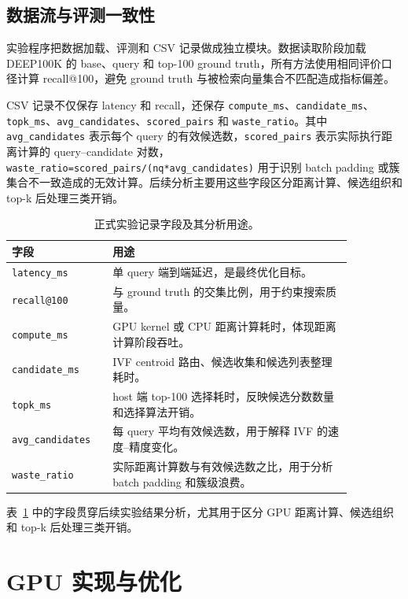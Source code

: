 \documentclass[10pt,a4paper]{article}
\begin{document}
\subsection{数据流与评测一致性}

实验程序把数据加载、评测和 CSV 记录做成独立模块。数据读取阶段加载 DEEP100K 的 base、query 和 top-100 ground truth，所有方法使用相同评价口径计算 recall@100，避免 ground truth 与被检索向量集合不匹配造成指标偏差。

CSV 记录不仅保存 latency 和 recall，还保存 \texttt{compute\_ms}、\texttt{candidate\_ms}、\texttt{topk\_ms}、\texttt{avg\_candidates}、\texttt{scored\_pairs} 和 \texttt{waste\_ratio}。其中 \texttt{avg\_candidates} 表示每个 query 的有效候选数，\texttt{scored\_pairs} 表示实际执行距离计算的 query--candidate 对数，\texttt{waste\_ratio=scored\_pairs/(nq*avg\_candidates)} 用于识别 batch padding 或簇集合不一致造成的无效计算。后续分析主要用这些字段区分距离计算、候选组织和 top-k 后处理三类开销。

\begin{table}[H]
\centering
\small
\caption{正式实验记录字段及其分析用途。}
\label{tab:metrics-fields}
\begin{tabular}{p{0.24\linewidth}p{0.62\linewidth}}
\toprule
字段 & 用途 \\
\midrule
\texttt{latency\_ms} & 单 query 端到端延迟，是最终优化目标。 \\
\texttt{recall@100} & 与 ground truth 的交集比例，用于约束搜索质量。 \\
\texttt{compute\_ms} & GPU kernel 或 CPU 距离计算耗时，体现距离计算阶段吞吐。 \\
\texttt{candidate\_ms} & IVF centroid 路由、候选收集和候选列表整理耗时。 \\
\texttt{topk\_ms} & host 端 top-100 选择耗时，反映候选分数数量和选择算法开销。 \\
\texttt{avg\_candidates} & 每 query 平均有效候选数，用于解释 IVF 的速度--精度变化。 \\
\texttt{waste\_ratio} & 实际距离计算数与有效候选数之比，用于分析 batch padding 和簇级浪费。 \\
\bottomrule
\end{tabular}
\end{table}
表~\ref{tab:metrics-fields} 中的字段贯穿后续实验结果分析，尤其用于区分 GPU 距离计算、候选组织和 top-k 后处理三类开销。

\section{GPU 实现与优化}
\end{document}
